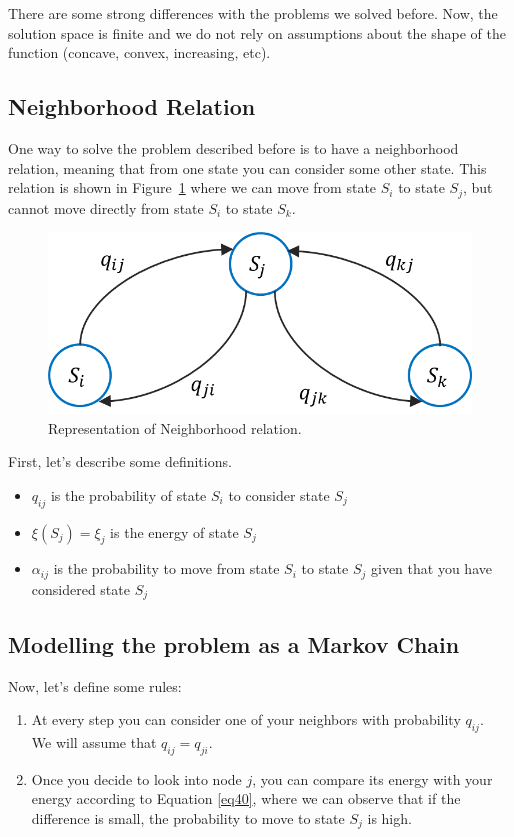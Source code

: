 There are some strong differences with the problems we solved before. Now, the solution space is finite and we do not rely on assumptions about the shape of the function (concave, convex, increasing, etc).

\subsection{Neighborhood Relation}

One way to solve the problem described before is to have a neighborhood relation, meaning that from one state you can consider some other state. This relation is shown in Figure~\ref{figur12} where we can move from state $S_i$ to state $S_j$, but cannot move directly from state $S_i$ to state $S_k$. 

\begin{figure}[h!]
\centering
\includegraphics[scale=.5]{neighborhoodRelation}
\caption{Representation of Neighborhood relation.}
\label{figur12}
\end{figure}

First, let's describe some definitions.
\begin{itemize}
\item $q_{ij}$ is the probability of state $S_i$ to consider state $S_j$
\item $\xi(S_j) = \xi_j$ is the energy of state $S_j$
\item $\alpha_{ij}$ is the probability to move from state $S_i$ to state $S_j$ given that you have considered state $S_j$
\end{itemize}

\subsection{Modelling the problem as a Markov Chain}

Now, let's define some rules: 
\begin{enumerate}
\item At every step you can consider one of your neighbors with probability $q_{ij}$.\\
\indent We will assume that $q_{ij} = q_{ji}$.
\item Once you decide to look into node $j$, you can compare its energy with your energy according to Equation \ref{eq40}, where we can observe that if the difference is small, the probability to move to state $S_j$ is high.
\end{enumerate}

